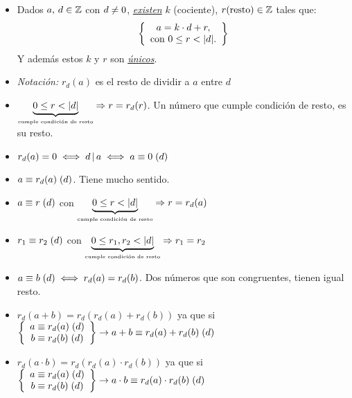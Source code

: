 \begin{itemize}
	\item
	      Dados $a, \, d \en \enteros$ con $d \distinto 0$,
	      \textit{\underline{existen}} $k$ (cociente),
	      $r \text{(resto)} \en \enteros$ tales que:\\
	      \[
		      \llaves{c}{
			      a =  k \cdot d + r,\\
			      \text{con } 0\leq r < |d|.
		      }
	      \]
	      Y además estos $k$ y $r$ son \textit{\underline{únicos}}.\\

	\item \textit{Notación: } $r_d(a)$ es el resto de dividir a $a$ entre $d$

	\item $\condicionResto{r} \entonces r = r_d(r)$. Un número que cumple condición de resto, es su resto.

	\item $r_d(a) = 0 \sisolosi d \divideA a \sisolosi \congruencia{a}{0}{d}$

	\item $\congruencia{a}{r_d(a)}{d}$. Tiene mucho sentido.

	\item $\congruencia{a}{r}{d}$ con $\condicionResto{r} \entonces r = r_d(a)$

	\item $\congruencia{r_1}{r_2}{d}$ con $\condicionResto{r_1,r_2} \entonces r_1 = r_2$

	\item $\congruencia{a}{b}{d} \sisolosi r_d(a) = r_d(b)$. Dos números que son congruentes, tienen igual resto.

	\item $r_d(a+b) = r_d(r_d(a) + r_d(b))$ ya que si
	      $ \llaves{c}{
			      \congruencia{a}{r_d(a)}{d}\\
			      \congruencia{b}{r_d(b)}{d}
		      } \to \congruencia{a + b}{r_d(a) + r_d(b)}{d}
	      $

	\item $r_d(a \cdot b) = r_d(r_d(a) \cdot r_d(b))$ ya que si
	      $ \llaves{c}{
			      \congruencia{a}{r_d(a)}{d}\\
			      \congruencia{b}{r_d(b)}{d}
		      } \to \congruencia{a \cdot b}{r_d(a) \cdot r_d(b)}{d}$
\end{itemize}

